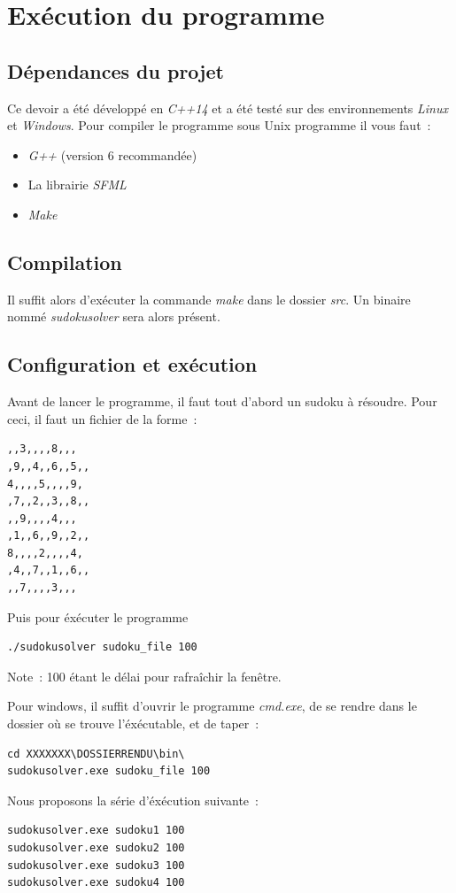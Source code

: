 \documentclass{article}
\begin{document}
\section{Exécution du programme}
\subsection{Dépendances du projet}
Ce devoir a été développé en \emph{C++14} et a été testé sur des environnements
\emph{Linux} et \emph{Windows}. Pour compiler le programme sous Unix
programme il vous faut~:
\begin{itemize}
    \item \emph{G++} (version 6 recommandée)
    \item La librairie \emph{SFML}
    \item \emph{Make}
\end{itemize}
\subsection{Compilation}
Il suffit alors d'exécuter la commande \emph{make} dans le dossier \emph{src}. Un
binaire nommé \emph{sudokusolver} sera alors présent.

\subsection{Configuration et exécution}

Avant de lancer le programme, il faut tout d'abord un sudoku à résoudre. Pour ceci, il faut un fichier de la forme~:

\begin{verbatim}
,,3,,,,8,,,
,9,,4,,6,,5,,
4,,,,5,,,,9,
,7,,2,,3,,8,,
,,9,,,,4,,,
,1,,6,,9,,2,,
8,,,,2,,,,4,
,4,,7,,1,,6,,
,,7,,,,3,,,
\end{verbatim}

Puis pour éxécuter le programme
\begin{verbatim}
./sudokusolver sudoku_file 100
\end{verbatim}

Note~: 100 étant le délai pour rafraîchir la fenêtre.

Pour windows, il suffit d'ouvrir le programme \emph{cmd.exe}, de se rendre dans le dossier où se trouve l'éxécutable, et de taper~:
\begin{verbatim}
cd XXXXXXX\DOSSIERRENDU\bin\
sudokusolver.exe sudoku_file 100
\end{verbatim}

Nous proposons la série d'éxécution suivante~:
\begin{verbatim}
sudokusolver.exe sudoku1 100
sudokusolver.exe sudoku2 100
sudokusolver.exe sudoku3 100
sudokusolver.exe sudoku4 100
\end{verbatim}
\end{document}
